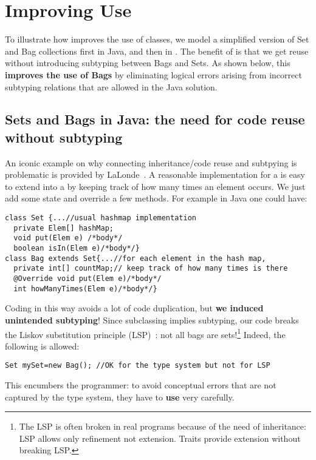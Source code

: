 \saveSpace
\section{Improving Use}
\saveSpace
To illustrate how 
\name improves the use of classes, we model a simplified version of
Set and Bag collections first in Java, and then in \name.
The benefit of \name is that we get reuse 
without introducing subtyping between Bags and Sets.
As shown below, this \textbf{improves the 
use of Bags} by eliminating logical errors arising from incorrect
subtyping relations that are allowed in the Java solution. 
\saveSpace
\subsection{Sets and Bags in Java: the need for code reuse without 
subtyping}
\saveSpace
An iconic example on why connecting inheritance/code reuse and
subtpying is problematic is provided by
LaLonde~\cite{LaLonde:1991:SSS:110673.110679}.  A reasonable
implementation for a \Q@Set@ is easy to extend into a \Q@Bag@ by
keeping track of how many times an element occurs.  We just add some state and override a few methods.
For example in Java one could have:
\saveSpace\saveSpace
\begin{lstlisting}
class Set {...//usual hashmap implementation
  private Elem[] hashMap;
  void put(Elem e) /*body*/
  boolean isIn(Elem e)/*body*/}
class Bag extends Set{...//for each element in the hash map,
  private int[] countMap;// keep track of how many times is there
  @Override void put(Elem e)/*body*/
  int howManyTimes(Elem e)/*body*/}
\end{lstlisting}
\saveSpace\saveSpace\saveSpace
\noindent Coding \Q@Bag@ in this way avoids a lot of code
duplication, but \textbf{we induced unintended subtyping}! 
Since subclassing implies subtyping, our code breaks the Liskov substitution principle (LSP)~\cite{martin2000design}: not all bags are sets!\footnote{The LSP is often broken in real programs because of the need of inheritance: LSP allows only refinement not extension. Traits provide extension without breaking LSP.}
Indeed, the following is allowed{:}%
\saveSpace\saveSpace
\begin{lstlisting}
Set mySet=new Bag(); //OK for the type system but not for LSP
\end{lstlisting}
\saveSpace\saveSpace
This encumbers the programmer:
to avoid conceptual errors that are not captured by the type system, 
they have to \textbf{use} \Q@Bag@ very carefully.


